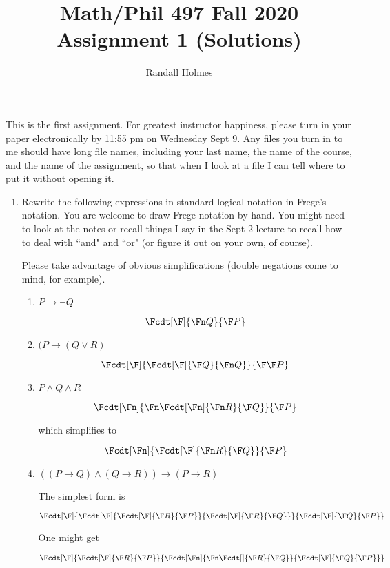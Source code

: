 \documentclass[12pt]{article}
\title{Math/Phil 497 Fall 2020 Assignment 1 (Solutions)}
\author{Randall Holmes}
\begin{document}
\maketitle

This is the first assignment.  For greatest instructor happiness, please turn in your paper electronically by 11:55 pm on Wednesday Sept 9.  Any files you turn in to me should have long file names, including your last name, the name of the course, and the name of the assignment, so that when I look at a file I can tell where to put it without opening it.

\begin{enumerate}

\item  Rewrite the following expressions in standard logical notation in Frege's notation.  You are welcome to draw Frege notation by hand.  You might need to look at the notes
or recall things I say in the Sept 2 lecture to recall how to deal with ``and" and ``or" (or figure it out on your own, of course).

Please take advantage of obvious simplifications (double negations come to mind, for example).

\begin{enumerate}

\item $P \rightarrow \neg Q$

$$\Fcdt[\F]{\Fn Q}{\F P}$$

\item$(P \rightarrow (Q \vee R)$

$$\Fcdt[\F]{\Fcdt[\F]{\F Q}{\Fn Q}}{\F\F P}$$

\item $P \wedge Q \wedge R$

$$\Fcdt[\Fn]{\Fn\Fcdt[\Fn]{\Fn R}{\F Q}}{\F P}$$

which simplifies to

$$\Fcdt[\Fn]{\Fcdt[\F]{\Fn R}{\F Q}}{\F P}$$

\item  $((P \rightarrow Q) \wedge (Q \rightarrow R)) \rightarrow (P \rightarrow R)$

The simplest form is

$$
\Fcdt[\F]
    {\Fcdt[\F]
          {\Fcdt[\F]{\F R}{\F P}}
          {\Fcdt[\F]{\F R}{\F Q}}}
    {\Fcdt[\F]{\F Q}{\F P}}$$

One might get

$$\Fcdt[\F]
       {\Fcdt[\F]{\F R}{\F P}}
       {\Fcdt[\Fn]
             {\Fn \Fcdt[]{\F R}{\F Q}}
             {\Fcdt[\F]{\F Q}{\F P}}
}$$


\end{enumerate}
\end{enumerate}
\end{document}
